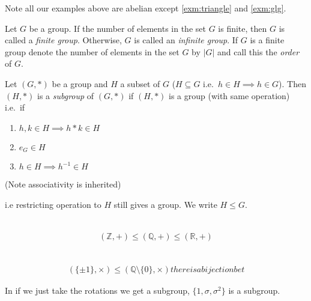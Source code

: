 Note all our examples above are abelian except \ref{exm:triangle} and \ref{exm:glg}.

\begin{definition}
Let \(G\) be a group. If the number of elements in the set \(G\) is finite, then \(G\) is called a \emph{finite group}. Otherwise, \(G\) is called an \emph{infinite group}. If \(G\) is a finite group denote the number of elements in the set \(G\) by \(|G|\) and call this the \emph{order} of \(G\).
\end{definition}

\begin{definition}[Subgroup]
Let \((G, *)\) be a group and \(H\) a subset of \(G\) (\(H \subseteq G\) i.e.~\(h \in H \implies h \in G\)). Then \((H, *)\) is a \emph{subgroup} of \((G, *)\) if \((H, *)\) is a group (with same operation) i.e.~if

\begin{enumerate}
\def\labelenumi{\alph{enumi})}
\item
  \(h, k \in H \implies h * k \in H\)
\item
  \(e_G \in H\)
\item
  \(h \in H \implies h^{-1} \in H\)
\end{enumerate}

(Note associativity is inherited)

i.e restricting operation to \(H\) still gives a group. We write \(H \leq G\).
\end{definition}

\begin{example} ~\vspace*{-1.5\baselineskip}
\begin{align*}
    (\mathbb{Z}, +) \leq (\mathbb{Q}, +) \leq (\mathbb{R}, +)
\end{align*}
\end{example}

\begin{example} ~\vspace*{-1.5\baselineskip}
\begin{align*}
    (\{\pm 1\}, \times) \leq (\mathbb{Q} \setminus \{ 0 \}, \times) 
    there is a bijection bet\end{align*}
\end{example}

\begin{example}
In  if we just take the rotations we get a subgroup, \(\{ 1, \sigma, \sigma^2 \}\) is a subgroup.
\end{example}

